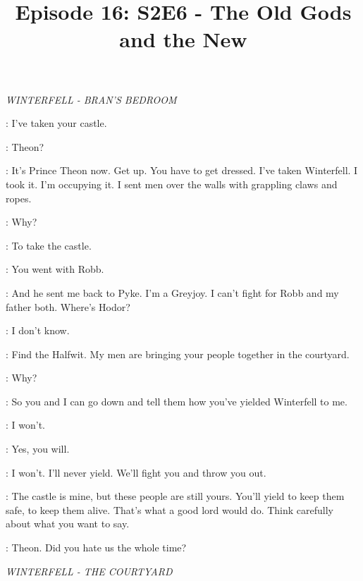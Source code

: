 

\title{Episode 16: S2E6 - The Old Gods and the New}
\author{}
\date{}
\maketitle



\scene

\textit{WINTERFELL - BRAN'S BEDROOM} 


\THEON: I've taken your castle. 

\BRAN: Theon? 

\THEON: It's Prince Theon now. Get up. You have to get dressed. I've taken Winterfell. I took it. I'm occupying it. I sent men over the walls with grappling claws and ropes. 

\BRAN: Why? 

\THEON: To take the castle. 

\BRAN: You went with Robb. 

\THEON: And he sent me back to Pyke. I'm a Greyjoy. I can't fight for Robb and my father both. Where's Hodor? 

\BRAN: I don't know. 

\THEON:  Find the Halfwit.  My men are bringing your people together in the courtyard. 

\BRAN: Why? 

\THEON: So you and I can go down and tell them how you've yielded Winterfell to me. 

\BRAN: I won't. 

\THEON: Yes, you will. 

\BRAN: I won't. I'll never yield. We'll fight you and throw you out. 

\THEON: The castle is mine, but these people are still yours. You'll yield to keep them safe, to keep them alive. That's what a good lord would do. Think carefully about what you want to say. 

\BRAN: Theon. Did you hate us the whole time? 


\scene

\textit{WINTERFELL - THE COURTYARD}


